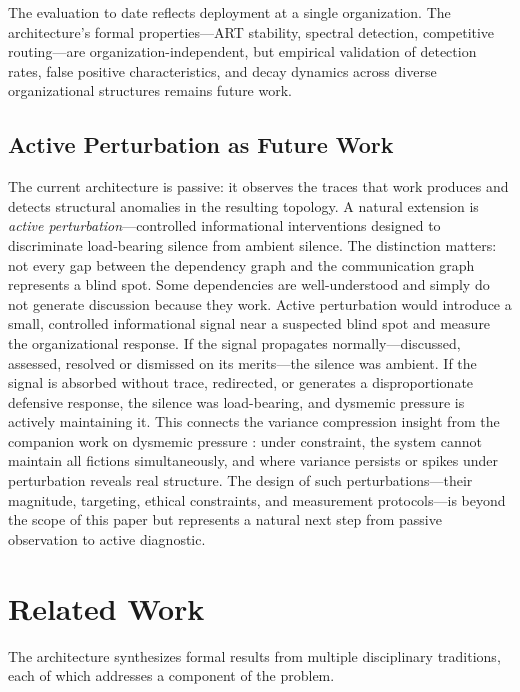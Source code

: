 \documentclass[11pt,a4paper]{article}
\begin{document}
The evaluation to date reflects deployment at a single organization. The architecture's formal properties---ART stability, spectral detection, competitive routing---are organization-independent, but empirical validation of detection rates, false positive characteristics, and decay dynamics across diverse organizational structures remains future work.


\subsection{Active Perturbation as Future Work}
\label{sec:perturbation}

The current architecture is passive: it observes the traces that work produces and detects structural anomalies in the resulting topology. A natural extension is \emph{active perturbation}---controlled informational interventions designed to discriminate load-bearing silence from ambient silence. The distinction matters: not every gap between the dependency graph and the communication graph represents a blind spot. Some dependencies are well-understood and simply do not generate discussion because they work. Active perturbation would introduce a small, controlled informational signal near a suspected blind spot and measure the organizational response. If the signal propagates normally---discussed, assessed, resolved or dismissed on its merits---the silence was ambient. If the signal is absorbed without trace, redirected, or generates a disproportionate defensive response, the silence was load-bearing, and dysmemic pressure is actively maintaining it. This connects the variance compression insight from the companion work on dysmemic pressure \citep{mcentire2025a}: under constraint, the system cannot maintain all fictions simultaneously, and where variance persists or spikes under perturbation reveals real structure. The design of such perturbations---their magnitude, targeting, ethical constraints, and measurement protocols---is beyond the scope of this paper but represents a natural next step from passive observation to active diagnostic.


\section{Related Work}
\label{sec:related}

The architecture synthesizes formal results from multiple disciplinary traditions, each of which addresses a component of the problem.
\end{document}
